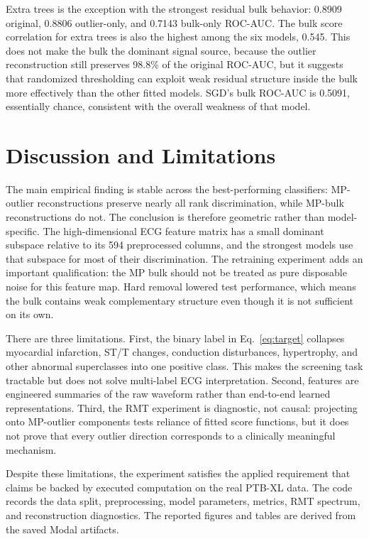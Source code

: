 \documentclass{article}
\begin{document}
Extra trees is the exception with the strongest residual bulk behavior: 0.8909 original, 0.8806 outlier-only, and 0.7143 bulk-only ROC-AUC. The bulk score correlation for extra trees is also the highest among the six models, 0.545. This does not make the bulk the dominant signal source, because the outlier reconstruction still preserves 98.8\% of the original ROC-AUC, but it suggests that randomized thresholding can exploit weak residual structure inside the bulk more effectively than the other fitted models. SGD's bulk ROC-AUC is 0.5091, essentially chance, consistent with the overall weakness of that model.

\section{Discussion and Limitations}

The main empirical finding is stable across the best-performing classifiers: MP-outlier reconstructions preserve nearly all rank discrimination, while MP-bulk reconstructions do not. The conclusion is therefore geometric rather than model-specific. The high-dimensional ECG feature matrix has a small dominant subspace relative to its 594 preprocessed columns, and the strongest models use that subspace for most of their discrimination. The retraining experiment adds an important qualification: the MP bulk should not be treated as pure disposable noise for this feature map. Hard removal lowered test performance, which means the bulk contains weak complementary structure even though it is not sufficient on its own.

There are three limitations. First, the binary label in Eq.~\eqref{eq:target} collapses myocardial infarction, ST/T changes, conduction disturbances, hypertrophy, and other abnormal superclasses into one positive class. This makes the screening task tractable but does not solve multi-label ECG interpretation. Second, features are engineered summaries of the raw waveform rather than end-to-end learned representations. Third, the RMT experiment is diagnostic, not causal: projecting onto MP-outlier components tests reliance of fitted score functions, but it does not prove that every outlier direction corresponds to a clinically meaningful mechanism.

Despite these limitations, the experiment satisfies the applied requirement that claims be backed by executed computation on the real PTB-XL data. The code records the data split, preprocessing, model parameters, metrics, RMT spectrum, and reconstruction diagnostics. The reported figures and tables are derived from the saved Modal artifacts.
\end{document}
